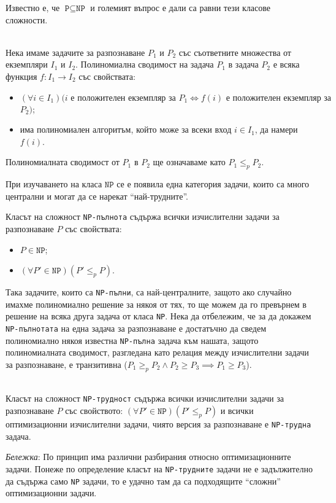 \documentclass[12pt,twoside,a4paper]{article}
\begin{document}
	Известно е, че $\texttt{P} \subseteq \texttt{NP}$ и големият въпрос е дали са равни тези класове сложности.
	
	\begin{definition}~\\
		\indent Нека имаме задачите за разпознаване $P_1$ и $P_2$ със съответните множества от екземпляри $I_1$ и $I_2$. Полиномиална сводимост на задача $P_1$ в задача $P_2$ е всяка функция $f: I_1 \to I_2$ със свойствата:
		\begin{itemize}
			\item $(\forall i \in I_1)(i\text{ е положителен екземпляр за }P_1 \iff f(i)\text{ е положителен екземпляр за }$ $P_2)$;
			\item има полиномиален алгоритъм, който може за всеки вход $i \in I_1$, да намери $f(i)$.
		\end{itemize}
		Полиномиалната сводимост от $P_1$ в $P_2$ ще означаваме като $P_1 \le_p P_2$.
	\end{definition}
	
	При изучаването на класа $\texttt{NP}$ се е появила една категория задачи, които са много централни и могат да се нарекат "`най-трудните"'.
	
	\begin{definition}
		\indent Класът на сложност \texttt{NP-пълнота} съдържа всички изчислителни задачи за разпознаване $P$ със свойствата:
		\begin{itemize}
			\item $P \in \texttt{NP}$;
			\item $(\forall P' \in \texttt{NP})(P' \le_p P)$. 
		\end{itemize}
	\end{definition}
	
	Така задачите, които са \texttt{NP-пълни}, са най-централните, защото ако случайно имахме полиномиално решение за някоя от тях, то ще можем да го превърнем в решение на всяка друга задача от класа \texttt{NP}. Нека да отбележим, че за да докажем \texttt{NP-пълнотата} на една задача за разпознаване е достатъчно да сведем полиномиално някоя известна \texttt{NP-пълна} задача към нашата, защото полиномиалната сводимост, разгледана като релация между изчислителни задачи за разпознаване, е транзитивна ($P_1 \ge_p P_2 \land P_2 \ge P_3 \implies P_1 \ge P_3$).
	
	\begin{definition}~\\
		\indent Класът на сложност \texttt{NP-трудност} съдържа всички изчислителни задачи за разпознаване $P$ със свойството: $(\forall P' \in \texttt{NP})(P' \le_p P)$ и всички оптимизационни изчислителни задачи, чиято версия за разпознаване е \texttt{NP-трудна} задача.
		
		\textit{Бележка}: По принцип има различни разбирания относно оптимизационните задачи. Понеже по определение класът на \texttt{NP-трудните} задачи не е задължително да съдържа само \texttt{NP} задачи, то е удачно там да са подходящите "`сложни"' оптимизационни задачи.
	\end{definition}
	
\end{document}
